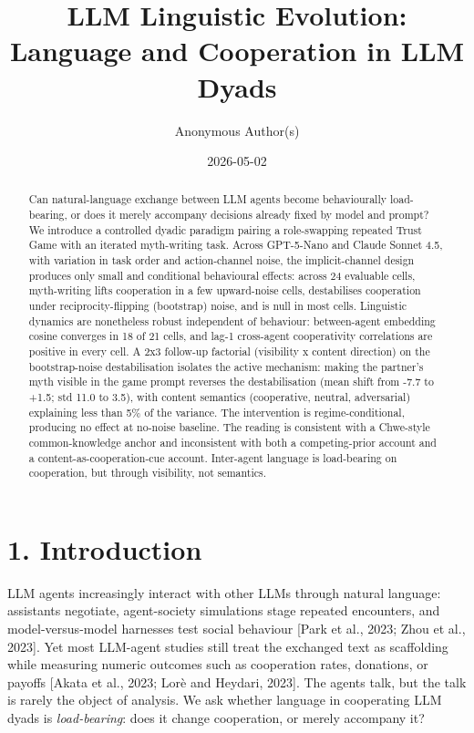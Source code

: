 \documentclass[
  10pt,
  letterpaper,
]{article}
\title{LLM Linguistic Evolution: Language and Cooperation in LLM Dyads}
\author{Anonymous Author(s)}
\date{2026-05-02}
\newcounter{none} %
\begin{document}
\maketitle
\begin{abstract}
Can natural-language exchange between LLM agents become behaviourally
load-bearing, or does it merely accompany decisions already fixed by
model and prompt? We introduce a controlled dyadic paradigm pairing a
role-swapping repeated Trust Game with an iterated myth-writing task.
Across GPT-5-Nano and Claude Sonnet 4.5, with variation in task order
and action-channel noise, the implicit-channel design produces only
small and conditional behavioural effects: across 24 evaluable cells,
myth-writing lifts cooperation in a few upward-noise cells, destabilises
cooperation under reciprocity-flipping (bootstrap) noise, and is null in
most cells. Linguistic dynamics are nonetheless robust independent of
behaviour: between-agent embedding cosine converges in 18 of 21 cells,
and lag-1 cross-agent cooperativity correlations are positive in every
cell. A 2x3 follow-up factorial (visibility x content direction) on the
bootstrap-noise destabilisation isolates the active mechanism: making
the partner's myth visible in the game prompt reverses the
destabilisation (mean shift from -7.7 to +1.5; std 11.0 to 3.5), with
content semantics (cooperative, neutral, adversarial) explaining less
than 5\% of the variance. The intervention is regime-conditional,
producing no effect at no-noise baseline. The reading is consistent with
a Chwe-style common-knowledge anchor and inconsistent with both a
competing-prior account and a content-as-cooperation-cue account.
Inter-agent language is load-bearing on cooperation, but through
visibility, not semantics.
\end{abstract}


\section{1. Introduction}\label{introduction}

LLM agents increasingly interact with other LLMs through natural
language: assistants negotiate, agent-society simulations stage repeated
encounters, and model-versus-model harnesses test social behaviour
{[}Park et al., 2023; Zhou et al., 2023{]}. Yet most LLM-agent studies
still treat the exchanged text as scaffolding while measuring numeric
outcomes such as cooperation rates, donations, or payoffs {[}Akata et
al., 2023; Lorè and Heydari, 2023{]}. The agents talk, but the talk is
rarely the object of analysis. We ask whether language in cooperating
LLM dyads is \emph{load-bearing}: does it change cooperation, or merely
accompany it?
\end{document}
